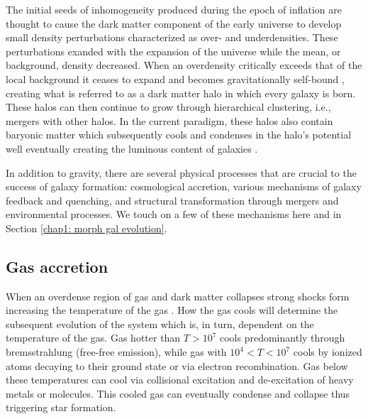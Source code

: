 The initial seeds of inhomogeneity produced during the epoch of inflation are thought to cause the dark matter component of the early universe to develop small density perturbations characterized as over- and underdensities. These perturbations exanded with the expansion of the universe while the mean, or background, density decreased. When an overdensity critically exceeds that of the local background it ceases to expand and becomes gravitationally self-bound \citep{Gunn1972}, creating what is referred to as a dark matter halo in which every galaxy is born. These halos can then continue to grow through hierarchical clustering, i.e., mergers with other halos. In the current paradigm, these halos also contain baryonic matter which subsequently cools and condenses in the halo's potential well eventually creating the luminous content of galaxies \citep{White1978}. 

In addition to gravity, there are several physical processes that are crucial to the success of galaxy formation: cosmological accretion, various mechanisms of galaxy feedback and quenching, and structural transformation through mergers and environmental processes. We touch on a few of these mechanisms here and in Section \ref{chap1: morph gal evolution}. 


\subsection{Gas accretion}
\label{chap1: accretion}

When an overdense region of gas and dark matter collapses strong shocks form increasing the temperature of the gas \citep{Binney1977,Rees1977}. How the gas cools will determine the subsequent evolution of the system which is, in turn, dependent on the temperature of the gas.  Gas hotter than $T>10^7$ cools predominantly through bremsstrahlung (free-free emission), while gas with $10^4<T<10^7$ cools by ionized atoms decaying to their ground state or via electron recombination. Gas below these temperatures can cool via collisional excitation and de-excitation of heavy metals or molecules. This cooled gas can eventually condense and collapse thus triggering star formation. 

